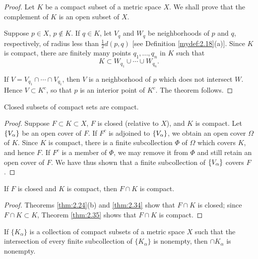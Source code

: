 \begin{proof}
    Let $K$ be a compact subset of a metric space $X$. 
    We shall prove that the complement of $K$ is an open subset of $X$.

    Suppose $p \in X$, $p \not\in K$. 
    If $q \in K$, let $V_q$ and $W_q$ be neighborhoods of $p$ and $q$, 
    respectively, of radius less than $\tfrac{1}{2}d(p, q)$ [see Definition \ref{mydef:2.18}(a)].
    Since $K$ is compact, there are finitely many points $q_1, ..., q_n$ in $K$ such that
    \begin{equation*}
        K \subset 
        W_{q_1} \cup \cdots \cup
        W_{q_n}. 
    \end{equation*}

    If $V=V_{q_1} \cap \cdots \cap V_{q_1}$, 
    then $V$ is a neighborhood of $p$ which does not intersect $W$. 
    Hence $V \subset K^c$, so that $p$ is an interior point of $K^c$.
    The theorem follows.
\end{proof}

\begin{thm}
    \label{thm:2.35}
    Closed subsets of compact sets are compact.
\end{thm}

\begin{proof}
    Suppose $F \subset K \subset X$, 
    $F$ is closed (relative to $X$), 
    and $K$ is compact. 
    Let $\protect\{V_\alpha\}$ be an open cover of $F$. 
    If $F^c$ is adjoined to $\protect\{V_\alpha\}$, 
    we obtain an open cover $\Omega$ of $K$. 
    Since $K$ is compact, there is a finite subcollection $\Phi$ of $\Omega$ which covers $K$, and hence $F$. 
    If $F^c$ is a member of $\Phi$, 
    we may remove it from $\Phi$ and still retain an open cover of $F$. 
    We have thus shown that a finite subcollection of $\protect\{V_\alpha\}$ covers $F$.
\end{proof}

\begin{myCorollary*}
    If $F$ is closed and $K$ is compact, then $F \cap K$ is compact.
\end{myCorollary*}

\begin{proof}
    Theorems \ref{thm:2.24}(b) and \ref{thm:2.34} show that $F \cap K$ is closed; 
    since $F \cap K \subset K$, 
    Theorem \ref{thm:2.35} shows that $F \cap K$ is compact.
\end{proof}

\begin{thm}
    \label{thm:2.36}
    If $\{K_\alpha\}$ is a collection of compact subsets of a metric space $X$ 
    such that the intersection of every finite subcollection of $\{K_\alpha\}$ is nonempty, 
    then $\cap K_\alpha$ is nonempty.    
\end{thm}

